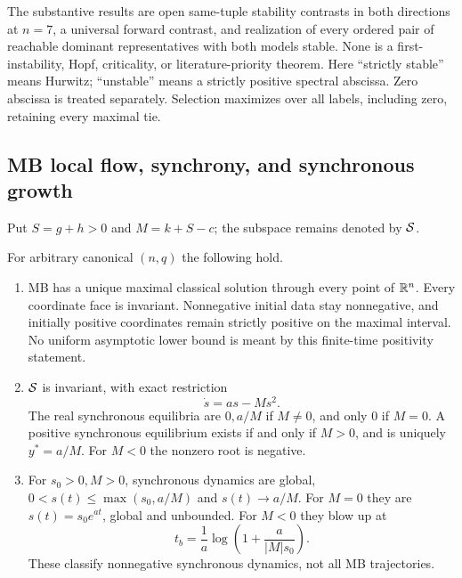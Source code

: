 The substantive results are open same-tuple stability contrasts in both
directions at $n=7$, a universal forward contrast, and realization of
every ordered pair of reachable dominant representatives with both
models stable. None is a first-instability, Hopf, criticality, or
literature-priority theorem. Here ``strictly stable'' means Hurwitz;
``unstable'' means a strictly positive spectral abscissa. Zero abscissa
is treated separately. Selection maximizes over all labels, including
zero, retaining every maximal tie.

\subsection{MB local flow, synchrony, and synchronous growth}
\label{slot:P08-1}
Put $S=g+h>0$ and $M=k+S-c$; the subspace remains denoted by $\mathcal{S}$.
\begin{theorem}[MB foundation]
\label{thm:P08-foundation}
For arbitrary canonical $(n,q)$ the following hold.
\begin{enumerate}[label=(\roman*),leftmargin=*]
\item MB has a unique maximal classical solution through every point of
$\mathbb{R}^n$. Every coordinate face is invariant. Nonnegative initial data
stay nonnegative, and initially positive coordinates remain strictly
positive on the maximal interval. No uniform asymptotic lower bound
is meant by this finite-time positivity statement.
\item $\mathcal{S}$ is invariant, with exact restriction
\begin{equation}
 \dot s=as-Ms^2.\label{eq:P08-scalar}
\end{equation}
The real synchronous equilibria are $0,a/M$ if $M\ne0$, and only $0$
if $M=0$. A positive synchronous equilibrium exists if and only if
$M>0$, and is uniquely $y^*=a/M$. For $M<0$ the nonzero root is negative.
\item For $s_0>0,M>0$, synchronous dynamics are global,
$0<s(t)\le\max(s_0,a/M)$ and $s(t)\to a/M$. For $M=0$ they are
$s(t)=s_0e^{at}$, global and unbounded. For $M<0$ they blow up at
\begin{equation}
 t_b=\frac1a\log\left(1+\frac{a}{|M|s_0}\right).
 \label{eq:P08-blowup}
\end{equation}
These classify nonnegative synchronous dynamics, not all MB trajectories.
\end{enumerate}
\end{theorem}
